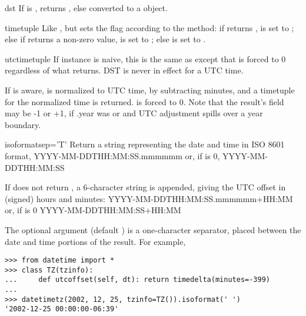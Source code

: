 \begin{methoddesc}{dst}{}
  If  is , returns , else
   converted to a 
  object.
\end{methoddesc}

\begin{methoddesc}{timetuple}{}
  Like , but sets the
   flag according to the  method:  if
   returns ,  is set to
  ; else if  returns a non-zero value,
   is set to ; else  is set
  to .
\end{methoddesc}

\begin{methoddesc}{utctimetuple}{}
  If  instance  is naive, this is the same as
   except that  is forced to 0
  regardless of what  returns.  DST is never in effect
  for a UTC time.

  If  is aware,  is normalized to UTC time, by subtracting
   minutes, and a timetuple for the
  normalized time is returned.   is forced to 0.
  Note that the result's  field may be
  -1 or +1, if .year was
   or  and UTC adjustment spills over a
  year boundary.
\end{methoddesc}

\begin{methoddesc}{isoformat}{sep='T'}
  Return a string representing the date and time in ISO 8601 format,
      YYYY-MM-DDTHH:MM:SS.mmmmmm
  or, if  is 0,
      YYYY-MM-DDTHH:MM:SS

  If  does not return , a 6-character
  string is appended, giving the UTC offset in (signed) hours and
  minutes:
      YYYY-MM-DDTHH:MM:SS.mmmmmm+HH:MM
  or, if  is 0
      YYYY-MM-DDTHH:MM:SS+HH:MM

  The optional argument  (default ) is a
  one-character separator, placed between the date and time portions
  of the result.  For example,

\begin{verbatim}
>>> from datetime import *
>>> class TZ(tzinfo):
...     def utcoffset(self, dt): return timedelta(minutes=-399)
...
>>> datetimetz(2002, 12, 25, tzinfo=TZ()).isoformat(' ')
'2002-12-25 00:00:00-06:39'
\end{verbatim}
\end{methoddesc}

